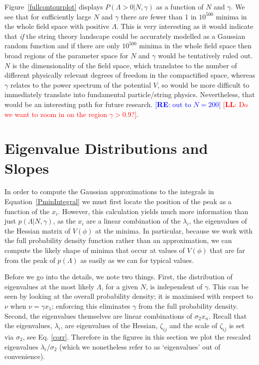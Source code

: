 \documentclass[12pt]{article}
\newcommand{\re}[1]{\textcolor{blue}{[{\bf RE}: #1]}}
\newcommand{\lfl}[1]{\textcolor{red}{[{\bf LL}: #1]}}
\begin{document}
Figure~\ref{fullcontourplot} displays  $P(\Lambda >0 |N,\gamma)$ as a function of $N$ and $\gamma$. We see that for sufficiently large $N$ and $\gamma$ there are fewer than 1 in $10^{500}$ minima in the whole field space with positive $\Lambda$. This is very interesting as it would indicate that \emph{if} the string theory landscape could be accurately modelled as a Gaussian random function and if there are only $10^{500}$ minima in the whole field space then broad regions of the parameter space for $N$ and $\gamma$ would be tentatively ruled out. $N$ is the dimensionality of the field space, which translates to the number of different physically relevant degrees of freedom in the compactified space, whereas $\gamma$ relates to the power spectrum of the potential $V$, so would be more difficult to immediately translate into fundamental particle/string physics. Nevertheless, that would be an interesting path for future research. \re{out to $N=200$} \lfl{Do we want to zoom in on the region $\gamma > 0.9$?}.


\section{Eigenvalue Distributions and Slopes} 

In order to compute the Gaussian  approximations to the integrals in Equation~\ref{PminIntegral} we must first locate the position of the peak as a function of the $x_i$. However, this calculation yields much more information than just $p(\Lambda  |N,\gamma)$, as the $x_i$ are a linear combination of the $\lambda_i$, the eigenvalues of the Hessian matrix of $V(\phi)$ at the minima. In particular, because we work with the full probability density function rather than an approximation, we can compute the likely shape of minima that occur at values of $V(\phi)$ that  are  far from the peak of $p(\Lambda)$ as easily as we can for typical values.

Before we go into the details, we note two things. First, the distribution of eigenvalues at the most likely $\Lambda$, for a given $N$, is independent of $\gamma$. This can be seen by looking at the overall probability density; it is maximised with respect to $\nu$ when $\nu = \gamma x_1$; enforcing this eliminates $\gamma$ from the full  probability density. Second, the eigenvalues themselves are linear combinations of $\sigma_2x_n$. Recall that the eigenvalues, $\lambda_i$, are eigenvalues of the Hessian, $\zeta_{ij}$ and the scale of $\zeta_{ij}$ is set via $\sigma_2$, see Eq. \eqref{corr}. Therefore in the figures in this section we plot the rescaled eigenvalues $\lambda_i/\sigma_2$ (which we nonetheless refer to as `eigenvalues' out of convenience).
\end{document}
